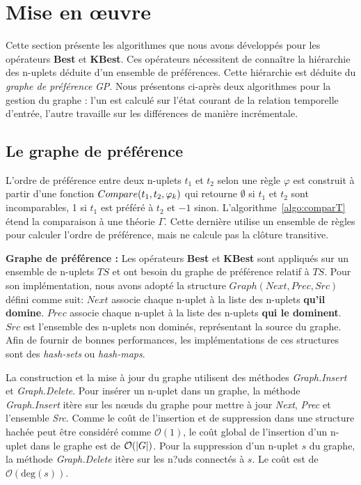 \section{Mise en œuvre}\label{sec:ext:prefs:algo}
Cette section présente les algorithmes que nous avons développés pour les opérateurs \textbf{Best} et \textbf{KBest}. Ces opérateurs nécessitent de connaître la hiérarchie des n-uplets déduite d'un ensemble de préférences. Cette hiérarchie est déduite du \textit{graphe de préférence} \textit{GP}. Nous présentons ci-après deux algorithmes pour la gestion du graphe : l'un est calculé sur l'état courant de la relation temporelle d'entrée, l'autre travaille sur les différences de manière incrémentale.

\subsection{Le graphe de préférence}
L'ordre de préférence entre deux n-uplets $t_1$ et $t_2$ selon une règle $\varphi$ est construit à partir d'une fonction $Com\-pare(t_1,t_2,\varphi_k)$ qui retourne $\emptyset$ si $t_1$ et $t_2$ sont incomparables, 1 si $t_1$ est préféré à $t_2$ et $-1$ sinon. L'algorithme~\ref{algo:comparT} étend la comparaison à une théorie $\Gamma$. Cette dernière utilise un ensemble de règles pour calculer l'ordre de préférence, mais ne calcule pas la clôture transitive.

\textbf{Graphe de préférence : }
Les opérateurs \textbf{Best} et \textbf{KBest} sont appliqués sur un ensemble de n-uplets $TS$ et ont besoin du graphe de préférence relatif à $TS$.
Pour son implémentation, nous avons adopté la structure $Graph(Next, Prec, Src)$ défini comme suit:
 $Next$ associe chaque n-uplet à la liste des n-uplets \textbf{qu'il domine}.
 $Prec$ associe chaque n-uplet à la liste des n-uplets \textbf{qui le dominent}.
 $Src$ est l'ensemble des n-uplets non dominés, représentant la source du graphe.
Afin de fournir de bonnes performances, les implémentations de ces structures sont des \textit{hash-sets} ou \textit{hash-maps}.

La construction et la mise à jour du graphe utilisent des méthodes \textit{Graph.Insert} et \textit{Graph.Delete}. Pour insérer un n-uplet dans un graphe, la méthode \textit{Graph.Insert} itère sur les nœuds du graphe pour mettre à jour \textit{Next}, \textit{Prec} et l'ensemble \textit{Src}. Comme le coût de l'insertion et de suppression dans une structure hachée peut être considéré comme $\mathcal O(1)$, le coût global de l'insertion d'un n-uplet dans le graphe est de $\mathcal O(\left| G \right|)$. Pour la suppression d'un n-uplet $s$ du graphe, la méthode \textit{Graph.Delete} itère sur les n?uds connectés à $s$. Le coût est de $\mathcal O(\mathrm{deg}(s))$.

